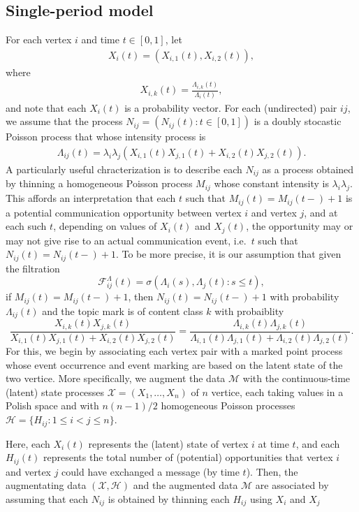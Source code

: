 \documentclass[12pt]{article}%
\begin{document}
\subsection{Single-period model}
For each vertex $i$ and time $t\in[0,1]$, let 
\begin{eqnarray}
X_i(t) = (X_{i,1}(t), X_{i,2}(t)),
\end{eqnarray}
where
\begin{eqnarray}
X_{i,k}(t) = \frac{\Lambda_{i,k}(t)}{\Lambda_i(t)},
\end{eqnarray}
and note that each $X_i(t)$ is a probability vector. 
For each (undirected) pair $ij$, we assume that 
the process $N_{ij} = (N_{ij}(t):t\in[0,1])$ is   
a doubly stocastic Poisson process that whose intensity process is  
\begin{eqnarray}
\Lambda_{ij}(t) = \lambda_i \lambda_j (X_{i,1}(t)X_{j,1}(t) + X_{i,2}(t)X_{j,2}(t)).
\end{eqnarray}
A particularly useful chracterization is to describe each $N_{ij}$ as a process obtained 
by thinning a homogeneous Poisson process $M_{ij}$ whose constant intensity is $\lambda_i \lambda_j$.  
This affords an interpretation that each $t$ such that $M_{ij}(t) = M_{ij}(t-) +1$ 
is a potential communication opportunity between vertex $i$ and vertex $j$, 
and at each such $t$, depending on values of $X_i(t)$ and $X_j(t)$, 
the opportunity may or may not give rise to an actual communication event, i.e.\ $t$ such that $N_{ij}(t) = N_{ij}(t-) +1$. To be more precise, it is our assumption that given the filtration 
$$
\mathcal F_{ij}^\Lambda(t) = \sigma(\Lambda_i(s), \Lambda_j(t): s \le t), 
$$
if $M_{ij}(t) = M_{ij}(t-)+1$, then
$N_{ij}(t) = N_{ij}(t-) + 1$ with probability $\Lambda_{ij}(t)$ and the topic mark is of content class $k$ with probaiblity 
$$
\frac{X_{i,k}(t)X_{j,k}(t)}{X_{i,1}(t)X_{j,1}(t) + X_{i,2}(t)X_{j,2}(t)}
=
\frac{\Lambda_{i,k}(t)\Lambda_{j,k}(t)}{\Lambda_{i,1}(t)\Lambda_{j,1}(t) + \Lambda_{i,2}(t)\Lambda_{j,2}(t)}.
$$
For this, we begin by associating each vertex pair with a marked point process whose 
event occurrence and event marking are based on the latent state of the two vertice. 
More specifically, we augment the data $\mathcal M$ with 
the continuous-time (latent) state processes $\mathcal X = (X_1,\ldots, X_n)$ of $n$ vertice,
each taking values in a Polish space and with $n(n-1)/2$ homogeneous Poisson processes 
$\mathcal H= \{H_{ij} : 1 \le i < j \le n\}$.  

Here, each $X_i(t)$ represents the (latent) state of vertex $i$ at time $t$,
and each $H_{ij}(t)$ represents the total number of (potential) opportunities
that vertex $i$ and vertex $j$ could have exchanged a message (by time $t$).  
Then, the augmentating data $(\mathcal X, \mathcal H)$ and 
the augmented data $\mathcal M$ are associated by assuming that 
each $N_{ij}$ is obtained by  thinning each $H_{ij}$ using $X_i$ and $X_j$ 
\end{document}
